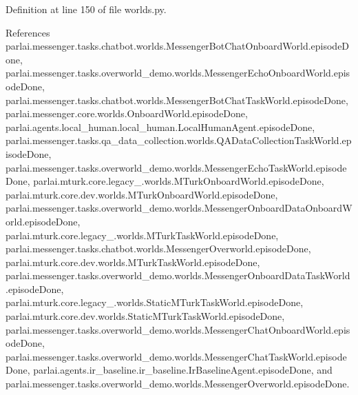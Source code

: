 Definition at line 150 of file worlds.\+py.



References parlai.\+messenger.\+tasks.\+chatbot.\+worlds.\+Messenger\+Bot\+Chat\+Onboard\+World.\+episode\+Done, parlai.\+messenger.\+tasks.\+overworld\+\_\+demo.\+worlds.\+Messenger\+Echo\+Onboard\+World.\+episode\+Done, parlai.\+messenger.\+tasks.\+chatbot.\+worlds.\+Messenger\+Bot\+Chat\+Task\+World.\+episode\+Done, parlai.\+messenger.\+core.\+worlds.\+Onboard\+World.\+episode\+Done, parlai.\+agents.\+local\+\_\+human.\+local\+\_\+human.\+Local\+Human\+Agent.\+episode\+Done, parlai.\+messenger.\+tasks.\+qa\+\_\+data\+\_\+collection.\+worlds.\+Q\+A\+Data\+Collection\+Task\+World.\+episode\+Done, parlai.\+messenger.\+tasks.\+overworld\+\_\+demo.\+worlds.\+Messenger\+Echo\+Task\+World.\+episode\+Done, parlai.\+mturk.\+core.\+legacy\+\_.\+worlds.\+M\+Turk\+Onboard\+World.\+episode\+Done, parlai.\+mturk.\+core.\+dev.\+worlds.\+M\+Turk\+Onboard\+World.\+episode\+Done, parlai.\+messenger.\+tasks.\+overworld\+\_\+demo.\+worlds.\+Messenger\+Onboard\+Data\+Onboard\+World.\+episode\+Done, parlai.\+mturk.\+core.\+legacy\+\_.\+worlds.\+M\+Turk\+Task\+World.\+episode\+Done, parlai.\+messenger.\+tasks.\+chatbot.\+worlds.\+Messenger\+Overworld.\+episode\+Done, parlai.\+mturk.\+core.\+dev.\+worlds.\+M\+Turk\+Task\+World.\+episode\+Done, parlai.\+messenger.\+tasks.\+overworld\+\_\+demo.\+worlds.\+Messenger\+Onboard\+Data\+Task\+World.\+episode\+Done, parlai.\+mturk.\+core.\+legacy\+\_.\+worlds.\+Static\+M\+Turk\+Task\+World.\+episode\+Done, parlai.\+mturk.\+core.\+dev.\+worlds.\+Static\+M\+Turk\+Task\+World.\+episode\+Done, parlai.\+messenger.\+tasks.\+overworld\+\_\+demo.\+worlds.\+Messenger\+Chat\+Onboard\+World.\+episode\+Done, parlai.\+messenger.\+tasks.\+overworld\+\_\+demo.\+worlds.\+Messenger\+Chat\+Task\+World.\+episode\+Done, parlai.\+agents.\+ir\+\_\+baseline.\+ir\+\_\+baseline.\+Ir\+Baseline\+Agent.\+episode\+Done, and parlai.\+messenger.\+tasks.\+overworld\+\_\+demo.\+worlds.\+Messenger\+Overworld.\+episode\+Done.

\mbox{\label{classparlai_1_1mturk_1_1core_1_1legacy__2018_1_1worlds_1_1StaticMTurkTaskWorld_ac9cfc1ec78d286d1a4da6b21455b7358}} 
